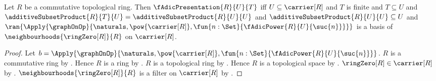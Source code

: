 \begin{proposition}\label{f_adic_presentation_iff}
    Let $R$ be a commutative topological ring.
    Then $\fAdicPresentation{R}{U}{T}$ iff
        $U\subseteq\carrier[R]$ and $T$ is finite and $T\subseteq U$ and
        $\additiveSubsetProduct{R}{T}{U}
            =\additiveSubsetProduct{R}{U}{U}$ and
        $\additiveSubsetProduct{R}{U}{U}\subseteq U$ and
        $\ran{\Apply{\graphOnOp}{
            \naturals,\pow{\carrier[R]},
            \fun{n:\Set}{\fAdicPower{R}{U}{\suc{n}}}}}$
            is a basis of $\neighbourhoods{\ringZero[R]}{R}$ on
                $\carrier[R]$.
\end{proposition}
\begin{proof}
    Let $b=\Apply{\graphOnOp}{
        \naturals,\pow{\carrier[R]},
        \fun{n:\Set}{\fAdicPower{R}{U}{\suc{n}}}}$.
    $R$ is a commutative ring by
        .
    Hence $R$ is a ring by .
    $R$ is a topological ring by
        .
    Hence $R$ is a topological space by
        .
    $\ringZero[R]\in\carrier[R]$ by .
    $\neighbourhoods{\ringZero[R]}{R}$ is a filter on $\carrier[R]$ by
        .


\end{proof}
